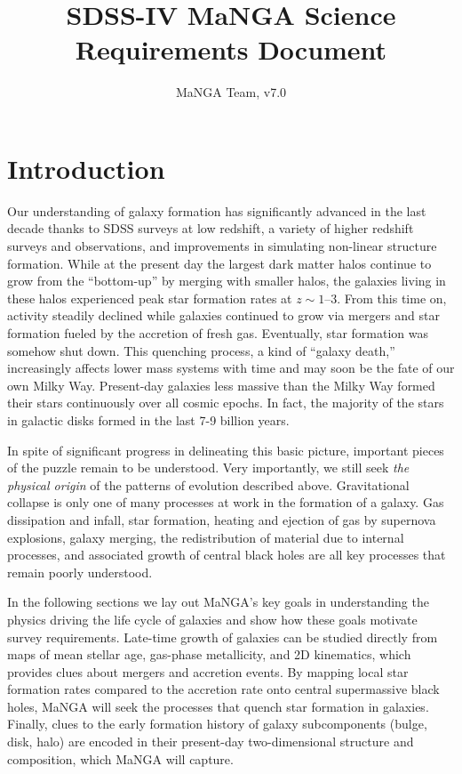 \documentclass[preprint,11pt]{aastex}
\title{SDSS-IV MaNGA Science Requirements Document}
\author{MaNGA Team, v7.0}
\begin{document}
\maketitle


\setcounter{tocdepth}{2}
\setcounter{secnumdepth}{3}
\tableofcontents


\section{Introduction}
\label{srd:intro}

Our understanding of galaxy formation has significantly advanced in
the last decade thanks to SDSS surveys at low redshift, a variety of
higher redshift surveys and observations, and improvements in
simulating non-linear structure formation.  While at the present day
the largest dark matter halos continue to grow from the ``bottom-up''
by merging with smaller halos, the galaxies living in these halos
experienced peak star formation rates at $z \sim 1$--3.  From this
time on, activity steadily declined while galaxies continued to grow
via mergers and star formation fueled by the accretion of fresh gas.
Eventually, star formation was somehow shut down.  This quenching
process, a kind of ``galaxy death,'' increasingly affects lower mass
systems with time and may soon be the fate of our own Milky
Way. Present-day galaxies less massive than the Milky Way formed their
stars continuously over all cosmic epochs. In fact, the majority of
the stars in galactic disks formed in the last 7-9 billion years.

In spite of significant progress in delineating this basic picture,
important pieces of the puzzle remain to be understood.  Very
importantly, we still seek {\em the physical origin} of the patterns
of evolution described above.  Gravitational collapse is only one of
many processes at work in the formation of a galaxy. Gas dissipation
and infall, star formation, heating and ejection of gas by supernova
explosions, galaxy merging, the redistribution of material due to internal processes, and associated growth of central black
holes are all key processes that remain poorly understood.

In the following sections we lay out MaNGA's key goals in understanding the physics driving the life cycle of galaxies and show
how these goals motivate survey requirements.  Late-time growth of galaxies can be studied directly from maps of mean stellar age, gas-phase
metallicity, and 2D kinematics, which provides clues about mergers and accretion events.  By mapping local star formation rates
compared to the accretion rate onto central supermassive black holes, MaNGA will seek the processes that quench star formation in
galaxies.  Finally, clues to the early formation history of galaxy subcomponents (bulge, disk, halo) are encoded in their
present-day two-dimensional structure and composition, which MaNGA will capture.
\end{document}
